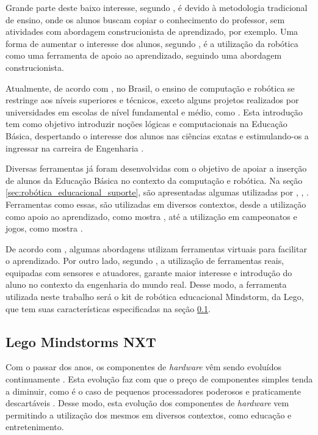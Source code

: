 Grande parte deste baixo interesse, segundo \cite{oQueEConstrutivismo}, é devido à metodologia tradicional de ensino, onde os alunos buscam copiar o conhecimento do professor, sem atividades com abordagem construcionista de aprendizado, por exemplo. Uma forma de aumentar o interesse dos alunos, segundo \cite{roboticaEducacionalAulasMatematica}, é a utilização da robótica como uma ferramenta de apoio ao aprendizado, seguindo uma abordagem construcionista.

Atualmente, de acordo com \cite{analiseFerramentaEnsinoComputacao}, no Brasil, o ensino de computação e robótica se restringe aos níveis superiores e técnicos, exceto alguns projetos realizados por universidades em escolas de nível fundamental e médio, como \cite{projetoRoboticaMauricio}. Esta introdução tem como objetivo introduzir noções lógicas e computacionais na Educação Básica, despertando o interesse dos alunos nas ciências exatas e estimulando-os a ingressar na carreira de Engenharia \cite{analiseFerramentaEnsinoComputacao}.

Diversas ferramentas já foram desenvolvidas com o objetivo de apoiar a inserção de alunos da Educação Básica no contexto da computação e robótica. Na seção \ref{sec:robótica_educacional_suporte}, são apresentadas algumas utilizadas por \cite{analiseFerramentaEnsinoComputacao}, \cite{projetoRoboticaMauricio}, \cite{simpleRobotsIntroductionEng}. Ferramentas como essas, são utilizadas em diversos contextos, desde a utilização como apoio ao aprendizado, como mostra \cite{teachingWithRoboticKit}, até a utilização em campeonatos e jogos, como mostra \cite{ciber-rato}. 

De acordo com \cite{analiseFerramentaEnsinoComputacao}, algumas abordagens utilizam ferramentas virtuais para facilitar o aprendizado. Por outro lado, segundo \cite{simpleMobile}, a utilização de ferramentas reais, equipadas com sensores e atuadores, garante maior interesse e introdução do aluno no contexto da engenharia do mundo real. Desse modo, a ferramenta utilizada neste trabalho será o kit de robótica educacional Mindstorm, da Lego, que tem suas características especificadas na seção \ref{sub:kit_mindstorm}.

\subsection{Lego Mindstorms NXT} %
\label{sub:kit_mindstorm}

Com o passar dos anos, os componentes de \textit{hardware} vêm sendo evoluídos continuamente \cite{teachingWithRoboticKit}. Esta evolução faz com que o preço de componentes simples tenda a diminuir, como é o caso de pequenos processadores poderosos e praticamente descartáveis \cite{teachingWithRoboticKit}. Desse modo, esta evolução dos componentes de \textit{hardware} vem permitindo a utilização dos mesmos em diversos contextos, como educação e entretenimento. 

